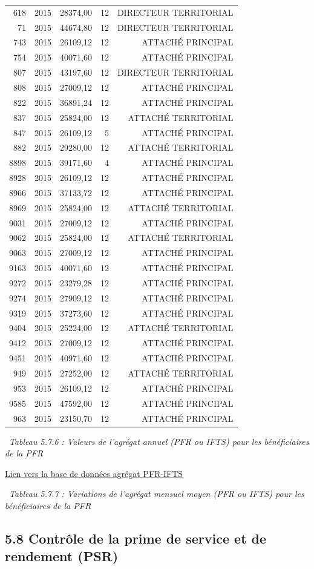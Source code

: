 \begin{longtable}[]{@{}rrrrr@{}}
618 & 2015 & 28374,00 & 12 & DIRECTEUR TERRITORIAL\tabularnewline
71 & 2015 & 44674,80 & 12 & DIRECTEUR TERRITORIAL\tabularnewline
743 & 2015 & 26109,12 & 12 & ATTACHÉ PRINCIPAL\tabularnewline
754 & 2015 & 40071,60 & 12 & ATTACHÉ PRINCIPAL\tabularnewline
807 & 2015 & 43197,60 & 12 & DIRECTEUR TERRITORIAL\tabularnewline
808 & 2015 & 27009,12 & 12 & ATTACHÉ PRINCIPAL\tabularnewline
822 & 2015 & 36891,24 & 12 & ATTACHÉ PRINCIPAL\tabularnewline
837 & 2015 & 25824,00 & 12 & ATTACHÉ TERRITORIAL\tabularnewline
847 & 2015 & 26109,12 & 5 & ATTACHÉ PRINCIPAL\tabularnewline
882 & 2015 & 29280,00 & 12 & ATTACHÉ TERRITORIAL\tabularnewline
8898 & 2015 & 39171,60 & 4 & ATTACHÉ PRINCIPAL\tabularnewline
8928 & 2015 & 26109,12 & 12 & ATTACHÉ PRINCIPAL\tabularnewline
8966 & 2015 & 37133,72 & 12 & ATTACHÉ PRINCIPAL\tabularnewline
8969 & 2015 & 25824,00 & 12 & ATTACHÉ TERRITORIAL\tabularnewline
9031 & 2015 & 27009,12 & 12 & ATTACHÉ PRINCIPAL\tabularnewline
9062 & 2015 & 25824,00 & 12 & ATTACHÉ TERRITORIAL\tabularnewline
9063 & 2015 & 27009,12 & 12 & ATTACHÉ PRINCIPAL\tabularnewline
9163 & 2015 & 40071,60 & 12 & ATTACHÉ PRINCIPAL\tabularnewline
9272 & 2015 & 23279,28 & 12 & ATTACHÉ PRINCIPAL\tabularnewline
9274 & 2015 & 27909,12 & 12 & ATTACHÉ PRINCIPAL\tabularnewline
9319 & 2015 & 37273,60 & 12 & ATTACHÉ PRINCIPAL\tabularnewline
9404 & 2015 & 25224,00 & 12 & ATTACHÉ TERRITORIAL\tabularnewline
9412 & 2015 & 27009,12 & 12 & ATTACHÉ PRINCIPAL\tabularnewline
9451 & 2015 & 40971,60 & 12 & ATTACHÉ PRINCIPAL\tabularnewline
949 & 2015 & 27252,00 & 12 & ATTACHÉ TERRITORIAL\tabularnewline
953 & 2015 & 26109,12 & 12 & ATTACHÉ PRINCIPAL\tabularnewline
9585 & 2015 & 47592,00 & 12 & ATTACHÉ PRINCIPAL\tabularnewline
963 & 2015 & 23150,70 & 12 & ATTACHÉ PRINCIPAL\tabularnewline
\bottomrule
\end{longtable}

~\emph{Tableau 5.7.6 : Valeurs de l'agrégat annuel (PFR ou IFTS) pour
les bénéficiaires de la PFR}

\href{../Bases/Remunerations/beneficiaires.PFR.IFTS.csv}{Lien vers la base
de données agrégat PFR-IFTS}

~\emph{Tableau 5.7.7 : Variations de l'agrégat mensuel moyen (PFR ou
IFTS) pour les bénéficiaires de la PFR}

\hypertarget{controle-de-la-prime-de-service-et-de-rendement-psr}{%
\subsection{5.8 Contrôle de la prime de service et de rendement
(PSR)}\label{controle-de-la-prime-de-service-et-de-rendement-psr}}

